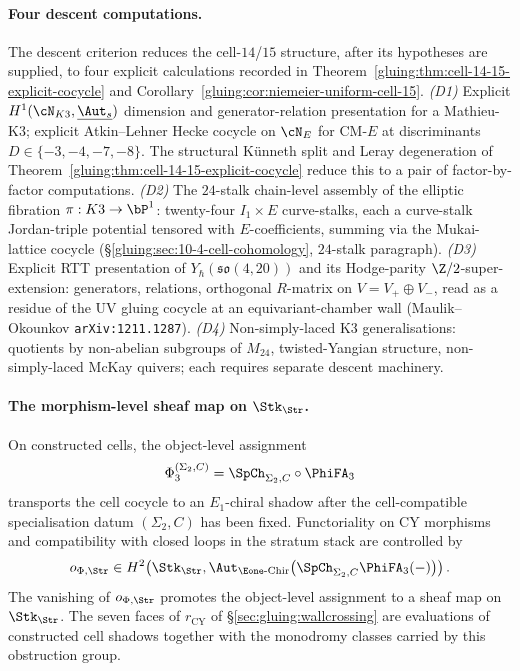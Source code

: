 \paragraph{Four descent computations.} The descent criterion reduces
the cell-$14$/$15$ structure, after its hypotheses are supplied, to
four explicit calculations recorded in
Theorem~\ref{gluing:thm:cell-14-15-explicit-cocycle} and
Corollary~\ref{gluing:cor:niemeier-uniform-cell-15}.
\emph{(D1)} Explicit $H^{1}(\cN_{K3},\underline{\Aut_{s}})$ dimension
and generator-relation presentation for a Mathieu-K3; explicit
Atkin--Lehner Hecke cocycle on $\cN_{E}$ for CM-$E$ at discriminants
$D\in\{-3,-4,-7,-8\}$. The structural K\"{u}nneth split and Leray
degeneration of Theorem~\ref{gluing:thm:cell-14-15-explicit-cocycle}
reduce this to a pair of factor-by-factor computations.
\emph{(D2)} The $24$-stalk chain-level assembly of the elliptic
fibration $\pi:K3\to\bP^{1}$: twenty-four $I_{1}\times E$ curve-stalks,
each a curve-stalk Jordan-triple potential tensored with
$E$-coefficients, summing via the Mukai-lattice cocycle
(\S\ref{gluing:sec:10-4-cell-cohomology}, \(24\)-stalk paragraph).
\emph{(D3)} Explicit RTT presentation of
$Y_\hbar(\mathfrak{so}(4, 20))$ and its Hodge-parity
$\Z/2$-super-extension: generators, relations, orthogonal
$R$-matrix on $V = V_+ \oplus V_-$, read as a residue
of the UV gluing cocycle at an equivariant-chamber wall
(Maulik--Okounkov \texttt{arXiv:1211.1287}).
\emph{(D4)} Non-simply-laced K3 generalisations: quotients by
non-abelian subgroups of $M_{24}$, twisted-Yangian structure,
non-simply-laced McKay quivers; each requires separate descent
machinery.

\paragraph{The morphism-level sheaf map on $\Stk_{\Str}$.} On
constructed cells, the object-level assignment
\[
 \Phi_3^{(\Sigma_2,C)}=\SpCh_{\Sigma_2,C}\circ\PhiFA_3
\]
transports the cell cocycle to an \(E_1\)-chiral shadow after the
cell-compatible specialisation datum \((\Sigma_2,C)\) has been fixed.
Functoriality on CY morphisms and compatibility with closed loops in
the stratum stack are controlled by
\[
 o_{\Phi,\Str}\in
 H^2\!\left(\Stk_{\Str},
 \Aut_{\Eone\text{-}\mathrm{Chir}}\bigl(\SpCh_{\Sigma_2,C}
 \PhiFA_3(-)\bigr)\right).
\]
The vanishing of \(o_{\Phi,\Str}\) promotes the object-level assignment
to a sheaf map on \(\Stk_{\Str}\). The seven faces of
\(r_{\mathrm{CY}}\) of \S\ref{sec:gluing:wallcrossing} are evaluations
of constructed cell shadows together with the monodromy classes carried
by this obstruction group.

